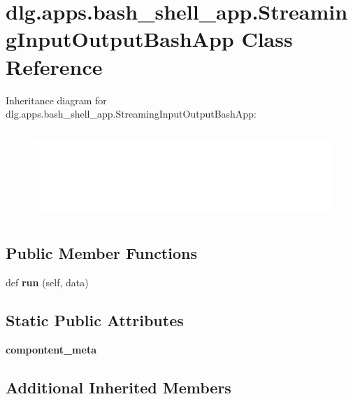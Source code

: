 \hypertarget{classdlg_1_1apps_1_1bash__shell__app_1_1_streaming_input_output_bash_app}{}\section{dlg.\+apps.\+bash\+\_\+shell\+\_\+app.\+Streaming\+Input\+Output\+Bash\+App Class Reference}
\label{classdlg_1_1apps_1_1bash__shell__app_1_1_streaming_input_output_bash_app}
Inheritance diagram for dlg.\+apps.\+bash\+\_\+shell\+\_\+app.\+Streaming\+Input\+Output\+Bash\+App\+:\begin{figure}[H]
\begin{center}
\leavevmode
\includegraphics[height=3.343284cm]{classdlg_1_1apps_1_1bash__shell__app_1_1_streaming_input_output_bash_app}
\end{center}
\end{figure}
\subsection*{Public Member Functions}
\begin{DoxyCompactItemize}
\item 
\mbox{\label{classdlg_1_1apps_1_1bash__shell__app_1_1_streaming_input_output_bash_app_a0fbaa8b016c4918709c50a384162d7b8}} 
def {\bfseries run} (self, data)
\end{DoxyCompactItemize}
\subsection*{Static Public Attributes}
\begin{DoxyCompactItemize}
\item 
{\bfseries compontent\+\_\+meta}
\end{DoxyCompactItemize}
\subsection*{Additional Inherited Members}



